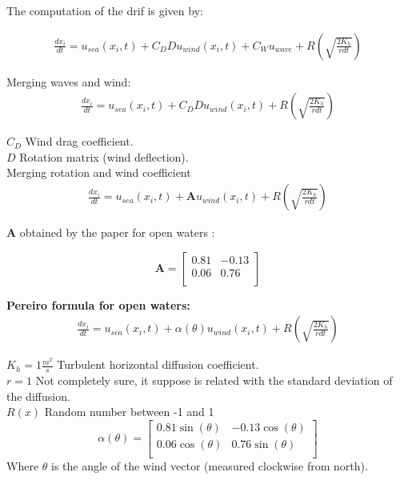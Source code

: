 \documentclass[a4paper,12pt]{article}
\begin{document}
\small
The computation of the drif is given by:

\begin{equation}
\begin{split}
\frac{dx_i}{dt} = u_{sea}(x_i, t) + C_D D u_{wind}(x_i,t) + C_W u_{wave} + R \left (\sqrt{\frac{2K_h}{r dt}} \right)
\end{split}
\end{equation}

Merging waves and wind: \\
\begin{equation}
\begin{split}
\frac{dx_i}{dt} = u_{sea}(x_i, t) + C_D D u_{wind}(x_i,t) + R \left (\sqrt{\frac{2K_h}{r dt}} \right)
\end{split}
\end{equation}

$C_D$ Wind drag coefficient. \\
$D$ Rotation matrix (wind deflection).\\

Merging rotation and wind coefficient
\begin{equation}
\begin{split}
\frac{dx_i}{dt} = u_{sea}(x_i, t) + \pmb{A}u_{wind}(x_i,t) + R \left (\sqrt{\frac{2K_h}{r dt}} \right)
\end{split}
\end{equation}

$\pmb{A}$ obtained by the paper for open waters : 

\begin{equation}
\pmb{A} = 
    \begin{bmatrix}
        0.81 & -0.13 \\
        0.06 & 0.76 \\
    \end{bmatrix}
\end{equation}

\textbf{Pereiro formula for open waters:}
\begin{equation}
\begin{split}
\frac{dx_i}{dt} = u_{sea}(x_i, t) + \alpha(\theta) u_{wind}(x_i,t) + R \left (\sqrt{\frac{2K_h}{r dt}} \right)
\end{split}
\end{equation}

$K_h  = 1 \frac{m^2}{s}$ Turbulent horizontal diffusion coefficient. \\
$r  = 1$ Not completely sure, it suppose is related with the standard deviation of the diffusion. \\
$R(x)$ Random number between -1 and 1 \\
\begin{equation}
\alpha(\theta)
 = 
    \begin{bmatrix}
        0.81 \sin(\theta) & -0.13\cos(\theta) \\
        0.06 \cos(\theta) & 0.76 \sin(\theta) \\
    \end{bmatrix}
\end{equation}
Where $\theta$ is the angle of the wind vector (measured clockwise from north).\\
\end{document}
